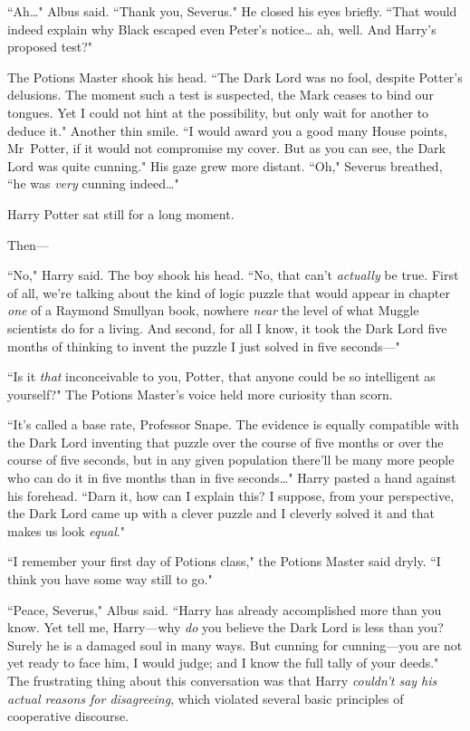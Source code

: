 ``Ah{\ldots}" Albus said. ``Thank you, Severus." He closed his eyes briefly. ``That would indeed explain why Black escaped even Peter's notice{\ldots} ah, well. And Harry's proposed test?"

The Potions Master shook his head. ``The Dark Lord was no fool, despite Potter's delusions. The moment such a test is suspected, the Mark ceases to bind our tongues. Yet I could not hint at the possibility, but only wait for another to deduce it." Another thin smile. ``I would award you a good many House points, Mr~Potter, if it would not compromise my cover. But as you can see, the Dark Lord was quite cunning." His gaze grew more distant. ``Oh," Severus breathed, ``he was \emph{very} cunning indeed{\ldots}"

Harry Potter sat still for a long moment.

Then—

``No," Harry said. The boy shook his head. ``No, that can't \emph{actually} be true. First of all, we're talking about the kind of logic puzzle that would appear in chapter \emph{one} of a Raymond Smullyan book, nowhere \emph{near} the level of what Muggle scientists do for a living. And second, for all I know, it took the Dark Lord five months of thinking to invent the puzzle I just solved in five seconds—"

``Is it \emph{that} inconceivable to you, Potter, that anyone could be so intelligent as yourself?" The Potions Master's voice held more curiosity than scorn.

``It's called a base rate, Professor Snape. The evidence is equally compatible with the Dark Lord inventing that puzzle over the course of five months or over the course of five seconds, but in any given population there'll be many more people who can do it in five months than in five seconds{\ldots}" Harry pasted a hand against his forehead. ``Darn it, how can I explain this? I suppose, from your perspective, the Dark Lord came up with a clever puzzle and I cleverly solved it and that makes us look \emph{equal}."

``I remember your first day of Potions class," the Potions Master said dryly. ``I think you have some way still to go."

``Peace, Severus," Albus said. ``Harry has already accomplished more than you know. Yet tell me, Harry—why \emph{do} you believe the Dark Lord is less than you? Surely he is a damaged soul in many ways. But cunning for cunning—you are not yet ready to face him, I would judge; and I know the full tally of your deeds." \later The frustrating thing about this conversation was that Harry \emph{couldn't say his actual reasons for disagreeing}, which violated several basic principles of cooperative discourse.


